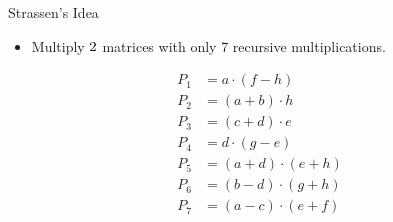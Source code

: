 \documentclass{beamer}
\begin{document}
\begin{frame}{Strassen's Idea}
    \begin{itemize}
        \item Multiply $2 \time 2$ matrices with only 7 recursive multiplications.
    \end{itemize}
    \begin{equation*}
        \begin{split}
            P_1 &= a \cdot (f - h) \\
            P_2 &= (a + b) \cdot h \\
            P_3 &= (c + d) \cdot e \\
            P_4 &= d \cdot (g - e) \\
            P_5 &= (a + d) \cdot (e + h) \\
            P_6 &= (b - d) \cdot (g + h) \\
            P_7 &= (a - c) \cdot (e + f) \\
        \end{split}
    \end{equation*}
\end{frame}
\end{document}
